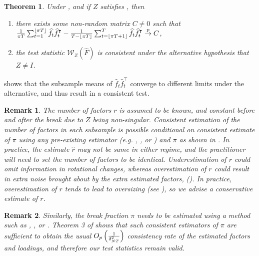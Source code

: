 \documentclass[12pt]{article}
\newtheorem{theorem}{Theorem}[section]
\newtheorem{remark}{Remark}
\newcommand*{\tran}{\intercal}
\theoremstyle{plain}
\numberwithin{equation}{section}
\begin{document}
\begin{theorem}
\label{thm:7:z_alter}
Under  , and if $Z$ satisfies , then
\begin{enumerate}
\item there exists some non-random matrix $C \neq 0$ such that \\
$\frac{1}{\pi T} \sumTfloor \widehat{f}_t \widehat{f}_t^\tran \allowbreak - \frac{1}{T - \floor{\pi T}} \sumTfloort \widehat{f}_t \widehat{f}_t^\tran \convp C$,
\item the test statistic $\mathscr{W}_Z(\widehat{F})$ is consistent under the alternative hypothesis that $Z \neq I$.
\end{enumerate}
\end{theorem}
 shows that the subsample means of $\widehat{f}_t \widehat{f}_t^\tran$ converge to different limits under the alternative, and thus result in a consistent test.
\begin{remark}
\label{rem:r_estimation}
The number of factors $r$ is assumed to be known, and constant before and after the break due to $Z$ being non-singular. Consistent estimation of the number of factors in each subsample is possible conditional on consistent estimate of $\pi$ using any pre-existing estimator (e.g. \textcite{bai_determining_2002}, \textcite{onatski_determining_2010}, or \textcite{ahn_eigenvalue_2013}) and $\pi$ as shown in \textcite{baltagi_identification_2017}. In practice, the estimate $\widehat{r}$ may not be same in either regime, and the practitioner will need to set the number of factors to be identical. Underestimation of $r$ could omit information in rotational changes, whereas overestimation of $r$ could result in extra noise brought about by the extra estimated factors, (\textcite{baltagi_identification_2017}). In practice, overestimation of $r$ tends to lead to oversizing (see ), so we advise a conservative estimate of $r$.
\end{remark}
\begin{remark}
\label{rem:k_estimation}
Similarly, the break fraction $\pi$ needs to be estimated using a method such as \textcite{baltagi_identification_2017}, \textcite{chen_estimating_2015}, or \textcite{duan_quasi-maximum_2022}. Theorem 3 of \textcite{baltagi_identification_2017} shows that such consistent estimators of $\pi$ are sufficient to obtain the usual $O_p\left( \frac{1}{\delta_{NT}^2}\right)$ consistency rate of the estimated factors and loadings, and therefore our test statistics remain valid.
\end{remark}
\end{document}
